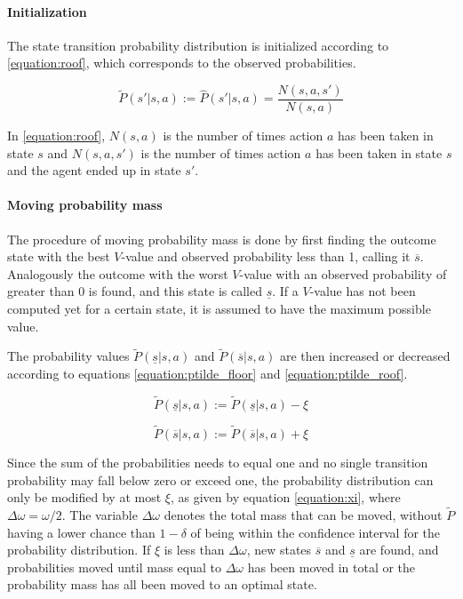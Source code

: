 \paragraph{Initialization} The state transition probability distribution is initialized according to
\eqref{equation:roof}, which corresponds to the observed probabilities.

\begin{equation}
\label{equation:roof}
\tilde{P}(s'|s, a) := \hat{P}(s'|s, a) = \frac{N(s,a,s')}{N(s,a)}
\end{equation}

In \eqref{equation:roof}, $N(s, a)$ is the number of times action $a$ has been taken in
state $s$ and $N(s, a, s')$ is the number of times action $a$ has been taken in
state $s$ and the agent ended up in state $s'$.

\paragraph{Moving probability mass} The procedure of moving probability mass is done by first finding the outcome
state with the best $V$-value and observed probability less than 1, calling it
$\overline{s}$. Analogously the outcome with the worst $V$-value with an
observed probability of greater than 0 is found, and this state is called
$\underline{s}$. If a $V$-value has not been computed yet for a certain state, it is 
assumed to have the maximum possible value. 

The probability values $\tilde{P}(\underline{s}|s,a)$ and
$\tilde{P}(\overline{s}|s,a)$ are then increased or decreased according to
equations \eqref{equation:ptilde_floor} and \eqref{equation:ptilde_roof}.

\begin{equation}
\label{equation:ptilde_floor}
\tilde{P}(\underline{s}|s,a) := \tilde{P}(\underline{s}|s,a)-\xi
\end{equation}

\begin{equation}
\label{equation:ptilde_roof}
\tilde{P}(\overline{s}|s,a) := \tilde{P}(\overline{s}|s,a)+\xi
\end{equation}

Since the sum of the probabilities needs to equal one and 
no single transition probability may fall below zero or exceed one, the probability distribution can only be modified by at most $\xi$, as given by
equation \eqref{equation:xi}, where $\Delta\omega = \omega / 2$. The variable $\Delta\omega$ denotes the total mass that can be moved, without $\tilde{P}$ having a lower chance than $1 - \delta$ of being within the confidence interval for the probability distribution. If $\xi$ is less than $\Delta \omega$, new states
$\overline{s}$ and $\underline{s}$ are found, and probabilities moved until
mass equal to $\Delta \omega$ has been moved in total or the probability mass has all been moved to an optimal state. 

